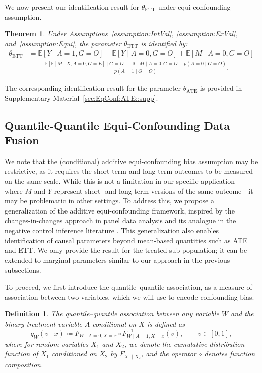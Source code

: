 \documentclass[10pt]{article}
\newtheorem{theorem}{Theorem}
\newtheorem{definition}{Definition}
\newcommand{\E}{\mathbb{E}}
\begin{document}
We now present our identification result for $\theta_{\text{ETT}}$ under equi-confounding assumption.

\begin{theorem}
\label{thm:equiETT}
Under Assumptions~\ref{assumption:IntVal}, \ref{assumption:ExVal}, and~\ref{assumption:Equi}, the parameter $\theta_{\text{ETT}}$ is identified by:
\begin{align*}
\theta_{\text{ETT}}
&= \E[Y \mid A=1, G=O] - \E[Y \mid A=0, G=O] + \E[M \mid A=0, G=O] \\
&\quad - \frac{ \E[ \E[M \mid X, A=0, G=E] \mid G=O ] - \E[M \mid A=0, G=O] \cdot p(A=0 \mid G=O) }{ p(A=1 \mid G=O) }.
\end{align*}
\end{theorem}

The corresponding identification result for the parameter $\theta_{\text{ATE}}$ is provided in Supplementary Material~\ref{sec:EqConf:ATE::supp}. 



\subsection{Quantile-Quantile Equi-Confounding Data Fusion}
\label{sec:QQCondEqui::supp}

We note that the (conditional) additive equi-confounding bias assumption may be restrictive, as it requires the short-term and long-term outcomes to be measured on the same scale. While this is not a limitation in our specific application---where \( M \) and \( Y \) represent short- and long-term versions of the same outcome---it may be problematic in other settings. To address this, we propose a generalization of the additive equi-confounding framework, inspired by the changes-in-changes approach in panel data analysis \citep{athey2006identification} and its analogue in the negative control inference literature \citep{sofer2016negative}. This generalization also enables identification of causal parameters beyond mean-based quantities such as ATE and ETT. We only provide the result for the treated sub-population; it can be extended to marginal parameters similar to our approach in the previous subsections.

To proceed, we first introduce the quantile–quantile  association, as a measure of association between two variables, which we will use to encode confounding bias. 

\begin{definition}
The quantile–quantile association between any variable $W$ and the binary treatment variable $A$ conditional on $X$ is defined as 
\[
q_W(v\mid x)\coloneqq F_{W\mid A=0,X=x}\circ F^{-1}_{W\mid A=1,X=x}(v),\quad\quad v\in[0,1],
\]
where for random variables $X_1$ and $X_2$, we denote the cumulative distribution function of $X_1$ conditioned on $X_2$ by $F_{X_1\mid X_2}$, and the operator $\circ$ denotes function composition.
\end{definition}
\end{document}
